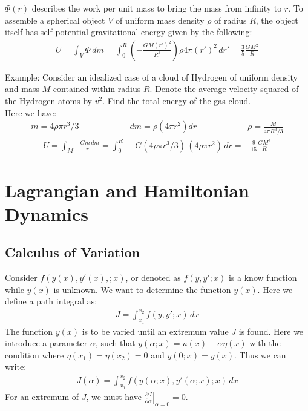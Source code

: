 \documentclass[11pt,oneside]{book}
\theoremstyle{break}
\theoremstyle{break}
\newcommand{\example}{\color{green}Example: \color{black}}
\begin{document}
$\Phi(r)$ describes the work per unit mass to bring the mass from infinity to $r$. To assemble a spherical object $V$ of uniform mass density $\rho$ of radius $R$, the object itself has self potential gravitational energy given by the following:
\begin{align*}
U = \int_V \Phi \, dm = \int_0^R \left(-\frac{GM(r')^2}{R^3} \right) \rho 4\pi (r')^2 \, dr' = \frac{3}{5}\frac{GM^2}{R}
\end{align*}


\example
Consider an idealized case of a cloud of Hydrogen of uniform density and mass $M$ contained within radius $R$. Denote the average velocity-squared of the Hydrogen atoms by $v^2$. Find the total energy of the gas cloud. \\

Here we have:
\begin{align*}
m= 4\rho \pi r^3/3 \qquad\qquad\qquad dm = \rho(4\pi r^2)dr \qquad\qquad\qquad \rho = \frac{M}{4\pi R^3/3}
\end{align*}
\begin{align*}
U = \int_M  \frac{-G m\, dm}{r} = \int_0^R -G (4\rho \pi r^3/3 )\, (4\rho\pi r^2)\, dr = -\frac{9}{15}\frac{GM^2}{R}
\end{align*}





\newpage
\chapter{Lagrangian and Hamiltonian Dynamics}
\section[Calculus of Variation]{\color{red}Calculus of Variation\color{black}}
Consider $f(y(x), y'(x),; x)$, or denoted as $f(y,y'; x)$ is a know function while $y(x)$ is unknown. We want to determine the function $y(x)$. Here we define a path integral as:
\begin{align*}
J = \int_{x_1}^{x_2}f (y,y'; x) \, dx
\end{align*}
The function $y(x)$ is to be varied until an extremum value $J$ is found. Here we introduce a parameter $\alpha$, such that $y(\alpha;x) = u(x) + \alpha \eta(x)$ with the condition where $\eta(x_1)= \eta(x_2) = 0 $ and $y(0;x) = y(x)$. Thus we can write:
\begin{align*}
J(\alpha) = \int_{x_1}^{x_2} f(y(\alpha;x) , y'(\alpha;x); x) \, dx
\end{align*} 
For an extremum of $J$, we must have $\left.\frac{\partial J}{\partial \alpha}\right|_{\alpha = 0} = 0$. \\
\end{document}
